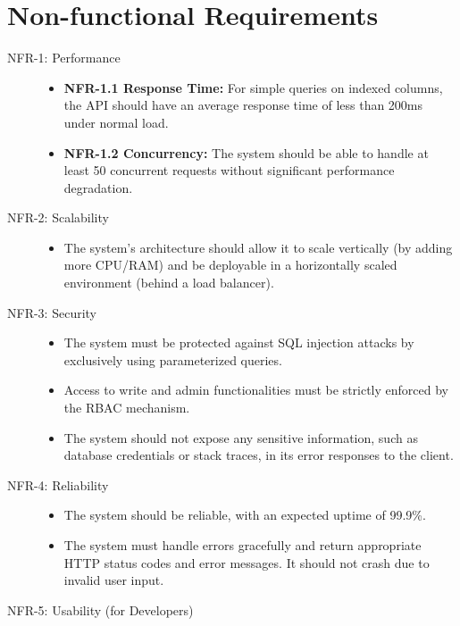 \documentclass[12pt, a4paper]{report}
\begin{document}
\section{Non-functional Requirements}
\begin{description}
    \item[NFR-1: Performance]
        \begin{itemize}
            \item \textbf{NFR-1.1 Response Time:} For simple queries on indexed columns, the API should have an average response time of less than 200ms under normal load.
            \item \textbf{NFR-1.2 Concurrency:} The system should be able to handle at least 50 concurrent requests without significant performance degradation.
        \end{itemize}
    \item[NFR-2: Scalability]
        \begin{itemize}
            \item The system's architecture should allow it to scale vertically (by adding more CPU/RAM) and be deployable in a horizontally scaled environment (behind a load balancer).
        \end{itemize}
    \item[NFR-3: Security]
        \begin{itemize}
            \item The system must be protected against SQL injection attacks by exclusively using parameterized queries.
            \item Access to write and admin functionalities must be strictly enforced by the RBAC mechanism.
            \item The system should not expose any sensitive information, such as database credentials or stack traces, in its error responses to the client.
        \end{itemize}
    \item[NFR-4: Reliability]
        \begin{itemize}
            \item The system should be reliable, with an expected uptime of 99.9\%.
            \item The system must handle errors gracefully and return appropriate HTTP status codes and error messages. It should not crash due to invalid user input.
        \end{itemize}
    \item[NFR-5: Usability (for Developers)]

\end{description}
\end{document}
